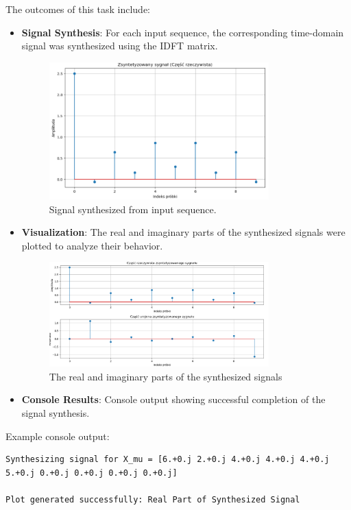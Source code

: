 \documentclass[12pt]{article}
\begin{document}
The outcomes of this task include:
\begin{itemize}
    \item \textbf{Signal Synthesis}: For each input sequence, the corresponding time-domain signal was synthesized using the IDFT matrix.
    
    \begin{figure}[h!]
        \centering
        \includegraphics[width=0.8\textwidth]{1.png}
        \caption{Signal synthesized from input sequence.}
    \end{figure}
    
    \item \textbf{Visualization}: The real and imaginary parts of the synthesized signals were plotted to analyze their behavior.
    \begin{figure}[h!]
        \centering
        \includegraphics[width=0.8\textwidth]{2.png}
        \caption{The real and imaginary parts of the synthesized signals}
    \end{figure}
    \item \textbf{Console Results}: Console output showing successful completion of the signal synthesis.
\end{itemize}


Example console output:
\begin{verbatim}
Synthesizing signal for X_mu = [6.+0.j 2.+0.j 4.+0.j 4.+0.j 4.+0.j 5.+0.j 0.+0.j 0.+0.j 0.+0.j 0.+0.j]

Plot generated successfully: Real Part of Synthesized Signal
\end{verbatim}
\end{document}

